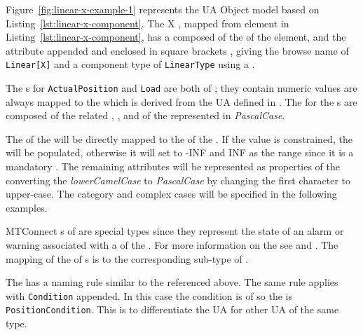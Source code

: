 

Figure~\ref{fig:linear-x-example-1} represents the UA Object model based on  Listing~\ref{lst:linear-x-component}. The  X , mapped from  element in Listing~\ref{lst:linear-x-component}, has a  composed of the  of the element, and the  attribute appended and enclosed in square brackets \element{[X]}, giving the browse name of \texttt{Linear[X]} and a component type of \texttt{LinearType} using a  .

The s for \texttt{ActualPosition} and \texttt{Load} are both of  ; they contain numeric values are always mapped to the  which is derived from the UA  defined in \cite{UAPart8}. The  for the s are composed of the related  , , and  of the  represented in \textit{PascalCase}.

The  of the  will be directly mapped to the   of the . If the value is constrained, the  will be populated, otherwise it will set to -INF and INF as the range since it is a mandatory . The remaining attributes will be represented as properties of the  converting the \textit{lowerCamelCase} to \textit{PascalCase} by changing the first character to upper-case. The  category and complex cases will be specified in the following examples.

MTConnect s of   are special types since they represent the state of an alarm or warning associated with a  of the . For more information on the  see \cite{MTCPart2} and \cite{MTCPart3}. The mapping of the   of s is to the corresponding  sub-type of .

The  has a naming rule similar to the  referenced above. The same rule applies with \texttt{Condition} appended. In this case the condition is of   so the  is \texttt{PositionCondition}. This is to differentiate the UA  for other UA  of the same type.


